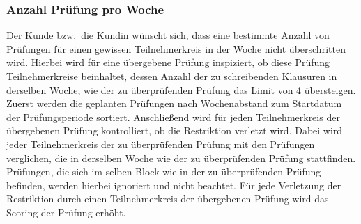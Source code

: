 \subsubsection{Anzahl Prüfung pro Woche}
Der Kunde bzw.\ die Kundin wünscht sich,
dass eine bestimmte Anzahl von Prüfungen für einen gewissen Teilnehmerkreis
in der Woche nicht überschritten wird.
Hierbei wird für eine übergebene Prüfung inspiziert,
ob diese Prüfung Teilnehmerkreise beinhaltet, dessen Anzahl der zu schreibenden Klausuren in derselben Woche,
wie der zu überprüfenden Prüfung das Limit von 4 übersteigen.
Zuerst werden die geplanten Prüfungen nach Wochenabstand zum Startdatum der Prüfungsperiode sortiert.
Anschließend wird für jeden Teilnehmerkreis der übergebenen Prüfung kontrolliert,
ob die Restriktion verletzt wird.
Dabei wird jeder Teilnehmerkreis der zu überprüfenden Prüfung mit
den Prüfungen verglichen, die in derselben Woche wie der zu überprüfenden Prüfung stattfinden.
Prüfungen, die sich im selben Block wie in der zu überprüfenden Prüfung befinden,
werden hierbei ignoriert und nicht beachtet.
Für jede Verletzung der Restriktion durch einen Teilnehmerkreis der übergebenen Prüfung wird das Scoring der Prüfung erhöht.



